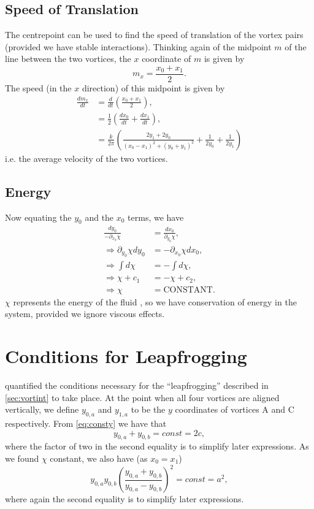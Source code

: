 \documentclass[10pt, a4paper]{article}
\numberwithin{equation}{section}
\newcommand{\inv}[1]{\frac{1}{#1}}
\newcommand{\half}{\frac{1}{2}}
\newcommand{\dxa}{\partial_{x_0}}
\newcommand{\dya}{\partial_{y_0}}
\begin{document}
\subsection{Speed of Translation}
The centrepoint can be used to find the speed of translation of the vortex pairs (provided we have stable interactions).
Thinking again of the midpoint $m$ of the line between the two vortices, the $x$ coordinate of $m$ is given by
\begin{equation}
m_x=\frac{x_0 +x_1}{2}.
\end{equation}
The speed (in the $x$ direction) of this midpoint is given by
\begin{align}
\frac{dm_x}{dt}&=\frac{d}{dt}\left(\frac{x_0 +x_1}{2}\right),\\
&=\half \left(\frac{dx_0}{dt} + \frac{dx_1}{dt}\right),\\
&=\frac{k}{2\pi}\left(\frac{2y_1+2y_0}{(x_0-x_1)^2 + (y_0+y_1)^2} + \inv{2y_0} + \inv{2y_1}\right)
\end{align}
i.e. the average velocity of the two vortices.
\subsection{Energy}
Now equating the $y_0$ and the $x_0$ terms, we have 
\begin{align}
\frac{dy_0}{-\dxa \chi} &= \frac{dx_0}{\dya \chi},\\
\Rightarrow \dya \chi dy_0 &= - \dxa \chi dx_0,\\
\Rightarrow \int d\chi &= - \int d\chi,\\
\Rightarrow \chi +c_1 &= -\chi + c_2,\\
\Rightarrow \chi &= \mbox{CONSTANT}.
\end{align}
$\chi$ represents the energy of the fluid \citep{love94}, so we have conservation of energy in the system, provided we ignore viscous effects.
\clearpage
\section{Conditions for Leapfrogging}
\citet{love94} quantified the conditions necessary for the ``leapfrogging'' described in \cref{sec:vortint} to take place.
At the point when all four vortices are aligned vertically, we define $y_{0,a}$ and $y_{1,a}$ to be the $y$ coordinates of vortices A and C respectively.
From \cref{eq:consty} we have that
\begin{equation}
y_{0,a} + y_{0,b} = const = 2c,\label{eq:lc1}
\end{equation}
where the factor of two in the second equality is to simplify later expressions.
As we found $\chi$ constant, we also have (as $x_0=x_1$) 
\begin{equation}
y_{0,a}y_{0,b}\left(\frac{y_{0,a} + y_{0,b}}{y_{0,a}-y_{0,b}}\right)^2 = const = a^2,\label{eq:lc2}
\end{equation}
where again the second equality is to simplify later expressions.
\end{document}
